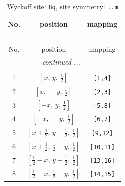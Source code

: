 \documentclass[fleqn,8pt]{jsarticle}
\begin{document}
\begin{longtable}{ccc}
\caption{Wyckoff site: {\tt 8q}, site symmetry: {\tt ..m}}
 \\
 \hline \hline
No. & position & mapping \\ \hline \endfirsthead

\multicolumn{2}{l}{\tablename\ \thetable{}} \\
 \hline \hline
No. & position & mapping \\ \hline \endhead

 \hline \hline
\multicolumn{2}{r}{\footnotesize\it continued ...} \\ \endfoot

 \hline \hline
\multicolumn{2}{r}{} \\ \endlastfoot

1 & $\left[ x,\, y,\, \frac{1}{2} \right]$ & {\tt [1,4]} \\ \hline
2 & $\left[ x,\, - y,\, \frac{1}{2} \right]$ & {\tt [2,3]} \\ \hline
3 & $\left[ - x,\, y,\, \frac{1}{2} \right]$ & {\tt [5,8]} \\ \hline
4 & $\left[ - x,\, - y,\, \frac{1}{2} \right]$ & {\tt [6,7]} \\ \hline
5 & $\left[ x + \frac{1}{2},\, y + \frac{1}{2},\, \frac{1}{2} \right]$ & {\tt [9,12]} \\ \hline
6 & $\left[ x + \frac{1}{2},\, \frac{1}{2} - y,\, \frac{1}{2} \right]$ & {\tt [10,11]} \\ \hline
7 & $\left[ \frac{1}{2} - x,\, y + \frac{1}{2},\, \frac{1}{2} \right]$ & {\tt [13,16]} \\ \hline
8 & $\left[ \frac{1}{2} - x,\, \frac{1}{2} - y,\, \frac{1}{2} \right]$ & {\tt [14,15]} \\
\end{longtable}
\renewcommand{\arraystretch}{1.2}
\end{document}
